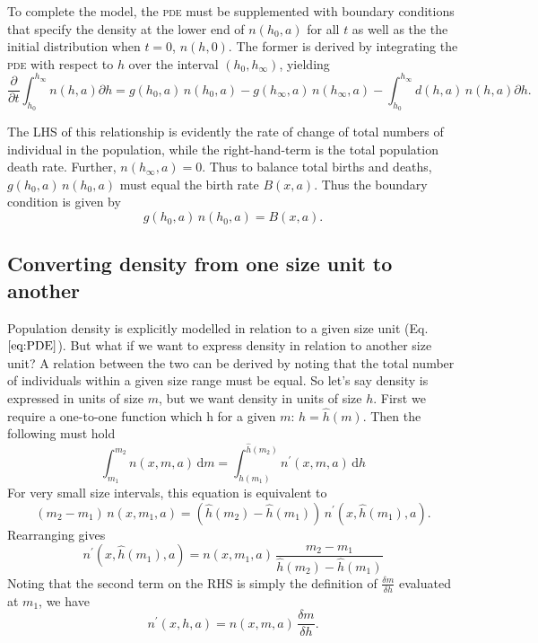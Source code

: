 \documentclass[10pt,twoside]{article}
\begin{document}
To complete the model, the \textsc{pde} must be supplemented with boundary
conditions that specify the density at the lower end of \(n(h_{0},a)\)
for all \(t\) as well as the the initial distribution when \(t=0\),
\(n(h,0)\). The former is derived by integrating the \textsc{pde} with respect to
\(h\) over the interval \((h_{0},h_{\infty })\), yielding
\begin{equation}\frac{\partial }{\partial t} \int _{h_{0} }^{h_{\infty } }n(h,a) \partial h=g(h_{0} ,a) \, n(h_{0} ,a)-g(h_{\infty } ,a) \, n(h_{\infty } ,a)-\int _{h_{0} }^{h_{\infty } }d (h,a) \, n(h,a) \partial h.
\end{equation}

The LHS of this relationship is evidently the rate of change of total
numbers of individual in the population, while the right-hand-term is
the total population death rate. Further, \(n(h_{\infty } ,a)=0\). Thus
to balance total births and deaths, \(g(h_{0} ,a) \, n(h_{0} ,a)\) must
equal the birth rate \(B(x, a)\). Thus the boundary condition is given
by
\begin{equation}g(h_{0} ,a) \, n(h_{0} ,a)=B(x, a).
\end{equation}

\subsection{Converting density from one size unit to
another}\label{converting-density-from-one-size-unit-to-another}

Population density is explicitly modelled in relation to a given size
unit (Eq. \(\ref{eq:PDE}\)). But what if we want to express density in
relation to another size unit? A relation between the two can be derived
by noting that the total number of individuals within a given size range
must be equal. So let's say density is expressed in units of size \(m\),
but we want density in units of size \(h\). First we require a
one-to-one function which h for a given \(m\): \(h = \hat{h}(m)\). Then
the following must hold
\begin{equation} \label{eq:n_conversion} \int_{m_1}^{m_2} n(x,m,a) \, \textrm{d}m =  \int_{\hat{h}(m_1)}^{\hat{h}(m_2)} n^\prime(x,m,a) \, \textrm{d}h
\end{equation}
For very small size intervals, this equation is equivalent to
\begin{equation} \left(m_2- m_1 \right) \, n(x,m_1,a) = \left( \hat{h}(m_2) - \hat{h}(m_1)\right) \, n^\prime(x, \hat{h}(m_1),a).
\end{equation}
Rearranging gives
\begin{equation}  n^\prime(x, \hat{h}(m_1),a) = n(x, m_1,a) \, \frac{m_2- m_1}{\hat{h}(m_2) - \hat{h}(m_1)}
\end{equation}
Noting that the second term on the RHS is simply the definition of
\(\frac{\delta m}{\delta h}\) evaluated at \(m_1\), we have
\begin{equation} \label{eq:n_conversion2} n^\prime(x, h, a) = n(x, m,a) \, \frac{\delta m}{\delta h}.
\end{equation}

\clearpage

\end{document}
